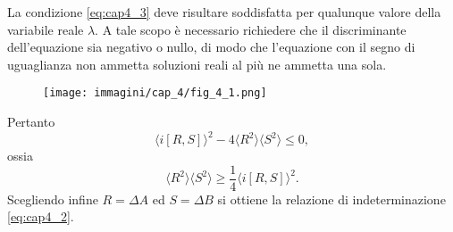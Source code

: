 \documentclass[a4paper,12pt,oneside]{book}
\begin{document}
La condizione \eqref{eq:cap4_3} deve risultare soddisfatta per qualunque valore della variabile reale $\lambda$. A tale scopo è necessario richiedere che il discriminante dell'equazione sia negativo o nullo, di modo che l'equazione con il segno di uguaglianza non ammetta soluzioni reali  al più ne ammetta una sola.

\begin{figure}[!htbp]
\begin{center}
\texttt{[image: immagini/cap\_4/fig\_4\_1.png]}
\end{center}
\end{figure}
\noindent Pertanto
\begin{equation}
\langle i \left[R,S \right] \rangle ^2 - 4\langle R^2 \rangle \langle S^2 \rangle \leq 0,
\end{equation}
ossia
\begin{equation}
\langle R^2 \rangle \langle S^2 \rangle \geq \frac{1}{4}\langle i \left[R,S \right] \rangle ^2.
\end{equation}
Scegliendo infine $R=\Delta A$ ed $S= \Delta B$ si ottiene la relazione di indeterminazione \eqref{eq:cap4_2}.
\end{document}
